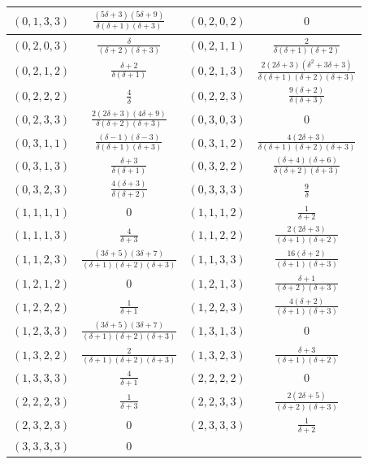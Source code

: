 \documentclass[12pt]{article}
\begin{document}
\begin{table}[ht!]
\begin{center}
\begin{tabular}{|l|c|l|c|}
   \hline
   $(0,1,3,3)$  &$\frac{(5\delta+3)(5\delta+9)}{\delta(\delta+1)(\delta+3)}$ & $(0,2,0,2)$& $0$  \\
   \hline
   $(0,2,0,3)$  &$\frac{\delta}{(\delta+2)(\delta+3)}$ & $(0,2,1,1)$& $\frac{2}{\delta(\delta+1)(\delta+2)}$\\
   \hline
   $(0,2,1,2)$  &$\frac{\delta+2}{\delta(\delta+1)}$ & $(0,2,1,3)$& $\frac{2(2\delta+3)(\delta^2+3\delta+3)}{\delta(\delta+1)(\delta+2)(\delta+3)}$\\
   \hline
  $(0,2,2,2)$  &$\frac{4}{\delta}$ & $(0,2,2,3)$& $\frac{9(\delta+2)}{\delta(\delta+3)}$\\
   \hline
   $(0,2,3,3)$  &$\frac{2(2\delta+3)(4\delta+9)}{\delta(\delta+2)(\delta+3)}$& $(0,3,0,3)$& $0$\\
   \hline
   $(0,3,1,1)$  &$\frac{(\delta-1)(\delta-3)}{\delta(\delta+1)(\delta+3)}$& $(0,3,1,2)$& $\frac{4(2\delta+3)}{\delta(\delta+1)(\delta+2)(\delta+3)}$\\
   \hline
   $(0,3,1,3)$  &$\frac{\delta+3}{\delta(\delta+1)}$& $(0,3,2,2)$& $\frac{(\delta+4)(\delta+6)}{\delta(\delta+2)(\delta+3)}$\\
   \hline
  $(0,3,2,3)$  &$\frac{4(\delta+3)}{\delta(\delta+2)}$& $(0,3,3,3)$& $\frac{9}{\delta}$\\
   \hline
  $(1,1,1,1)$  &$0$& $(1,1,1,2)$& $\frac{1}{\delta+2}$\\
   \hline
  $(1,1,1,3)$  &$\frac{4}{\delta+3}$& $(1,1,2,2)$& $\frac{2(2\delta+3)}{(\delta+1)(\delta+2)}$\\
   \hline
  $(1,1,2,3)$  &$\frac{(3\delta+5)(3\delta+7)}{(\delta+1)(\delta+2)(\delta+3)}$& $(1,1,3,3)$& $\frac{16(\delta+2)}{(\delta+1)(\delta+3)}$\\
   \hline
  $(1,2,1,2)$  &$0$& $(1,2,1,3)$& $\frac{\delta+1}{(\delta+2)(\delta+3)}$\\
   \hline
  $(1,2,2,2)$  &$\frac{1}{\delta+1}$& $(1,2,2,3)$& $\frac{4(\delta+2)}{(\delta+1)(\delta+3)}$\\
   \hline
 $(1,2,3,3)$  &$\frac{(3\delta+5)(3\delta+7)}{(\delta+1)(\delta+2)(\delta+3)}$& $(1,3,1,3)$& $0$\\
   \hline
  $(1,3,2,2)$  &$\frac{2}{(\delta+1)(\delta+2)(\delta+3)}$& $(1,3,2,3)$& $\frac{\delta+3}{(\delta+1)(\delta+2)}$\\
   \hline
  $(1,3,3,3)$  &$\frac{4}{\delta+1}$& $(2,2,2,2)$& $0$\\
   \hline
   $(2,2,2,3)$  &$\frac{1}{\delta+3}$& $(2,2,3,3)$& $\frac{2(2\delta+5)}{(\delta+2)(\delta+3)}$\\
   \hline
   $(2,3,2,3)$  &$0$& $(2,3,3,3)$& $\frac{1}{\delta+2}$\\
   \hline
  $(3,3,3,3)$  &$0$& & \\
   \hline
    \end{tabular}
  \end{center}
\end{table}
\end{document}

